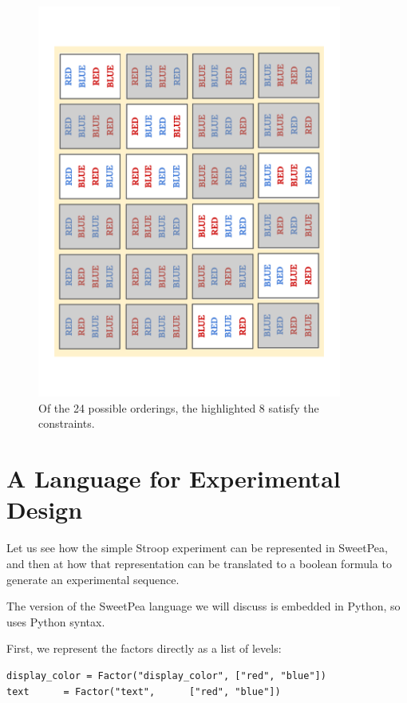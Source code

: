 \begin{figure}[t]
    \centerline{\includegraphics[angle=270,origin=c,width=10cm]{fig_valid_seqs}}
    \caption{Of the 24 possible orderings, the highlighted 8 satisfy the constraints.}%
    \label{fig:valid_seqs}%
\end{figure}


\section{A Language for Experimental Design}

Let us see how the simple Stroop experiment can be represented in SweetPea, and then at how that representation can be translated to a boolean formula to generate an experimental sequence.

The version of the SweetPea language we will discuss is embedded in Python, so uses Python syntax.

First, we represent the factors directly as a list of levels:

\begin{verbatim}
display_color = Factor("display_color", ["red", "blue"])
text      = Factor("text",      ["red", "blue"])
\end{verbatim}

